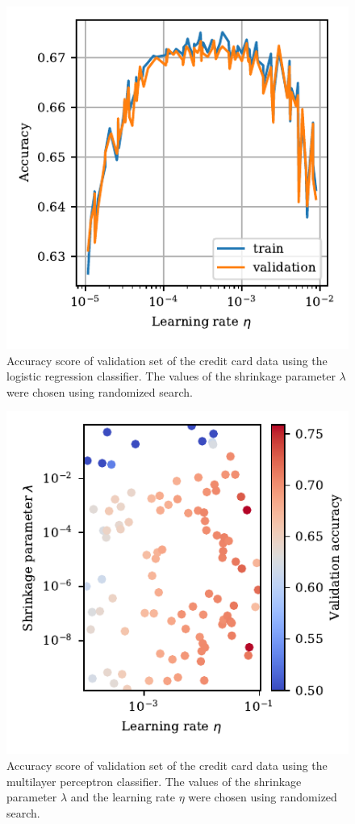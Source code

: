 \documentclass[a4paper, 11pt, twocolumn]{article}
\begin{document}
\begin{figure}[H]
	\includegraphics[scale=1]{figures/logreg_learning_rate_accuracy.pdf}
	\caption{Accuracy score of validation set of the credit card data using the logistic regression classifier. The values of the shrinkage parameter $\lambda$ were chosen using randomized search.}
\end{figure}

\begin{figure}[H]
	\includegraphics[scale=1]{figures/nn_learning_rate_lambda_accuracy_credit.pdf}
	\caption{Accuracy score of validation set of the credit card data using the multilayer perceptron classifier. The values of the shrinkage parameter $\lambda$ and the learning rate $\eta$ were chosen using randomized search.}
\end{figure}
\end{document}
